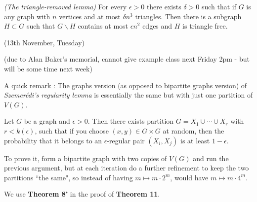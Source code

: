 \documentclass[12pt,a4paper]{report}
\newenvironment{proof}
{\begin{changemargin}{1cm}{0.5cm}
	}%
	{\end{changemargin}
}
\newenvironment{subproof}
{\begin{changemargin}{0.5cm}{0.5cm}
	}%
	{\end{changemargin}
}
\begin{document}
 \emph{(The triangle-removed lemma)} For every $\epsilon>0$ there exists $\delta >0$ such that if $G$ is any graph with $n$ vertices and at most $\delta n^3$ triangles. Then there is a subgraph $H\subset G$ such that $G \backslash H$ contains at most $\epsilon n^2$ edges and $H$ is triangle free.
\s

\newday

(13th November, Tuesday)
\s

(due to Alan Baker's memorial, cannot give example class next Friday 2pm - but will be some time next week)

\s

A quick remark : The graphs version (as opposed to bipartite graphs version) of \emph{Szemer\'{e}di's regularity lemma} is essentially the same but with just one partition of $V(G)$. 
\s
\begin{proof}
 Let $G$ be a graph and $\epsilon>0$. Then there exists partition $G = X_1 \cup \cdots \cup X_r$ with $r<k(\epsilon)$, such that if you choose $(x,y) \in G\times G$ at random, then the probability that it belongs to an $\epsilon$-regular pair $(X_i, X_j)$ is at least $1-\epsilon$.
\begin{subproof}
To prove it, form a bipartite graph with two copies of $V(G)$ and run the previous argument, but at each iteration do a further refinement to keep the two partitions ``the same", so instead of having $m \mapsto m\cdot 2^m$, would have $m\mapsto m\cdot 4^m$.
\end{subproof}
\end{proof}
\s

We use \textbf{Theorem 8'} in the proof of \textbf{Theorem 11}.
\s
\end{document}
